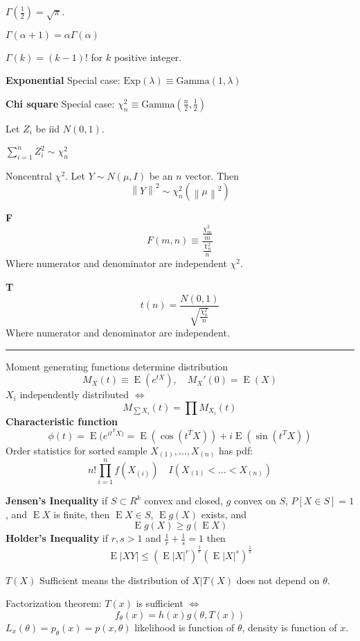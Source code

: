 \documentclass[10pt, twocolumn]{article}
\newcommand{\norm}[1]{\left\lVert#1\right\rVert}
\newcommand{\Expect}{\operatorname{E}}
\begin{document}
$\Gamma(\frac{1}{2}) = \sqrt{\pi}$.

$\Gamma(\alpha + 1) = \alpha \Gamma(\alpha)$

$\Gamma(k) = (k-1)!$ for $k$ positive integer.

\textbf{Exponential}
Special case: $\text{Exp}(\lambda) \equiv \text{Gamma}(1, \lambda)$

\textbf{Chi square}
Special case: $\chi^2_n \equiv \text{Gamma}(\frac{n}{2}, \frac{1}{2})$

Let $Z_i$ be iid $N(0, 1)$.

$\sum_{i=1}^n Z_i^2 \sim \chi^2_n$

Noncentral $\chi^2$. Let $Y \sim N(\mu, I)$ be an $n$ vector. Then 
\[
    \norm{Y}^2 \sim \chi^2_n(\norm{\mu}^2)
\]

\textbf{F}
\[
    F(m, n) \equiv \frac{\frac{\chi^2_m}{m}}
        {\frac{\chi^2_n}{n}}
\]
Where numerator and denominator are independent $\chi^2$.

\textbf{T}
\[
    t(n) = \frac{N(0, 1)}
    {\sqrt{\frac{\chi^2_n}{n}}}
\]
Where numerator and denominator are independent.

\vspace{0.2in}
\hrule

Moment generating functions determine distribution
\[
    M_X(t) \equiv \Expect (e^{tX}),
    \quad M_X'(0) = \Expect(X)
\]
$X_i$ independently distributed $\iff$
\[
    M_{\sum X_i} (t) = \prod M_{X_i} (t)
\]
\textbf{Characteristic function}
\[
    \phi(t) = \Expect (e^{i t^T X)}
    = \Expect (\cos (t^T X)) + i \Expect(\sin(t^T X))
\]
Order statistics for sorted sample $X_{(1)}, \dots, X_{(n)}$ has pdf:
\[
    n! \prod_{i=1}^n f(X_{(i)}) \quad I(X_{(1)} < \dots < X_{(n)})
\]

\newpage

\textbf{Jensen's Inequality} if $S \subset R^k$ convex and closed, $g$ convex on $S$, $P[X
\in S] = 1$, and $\Expect X$ is finite, then $\Expect X \in S$, $\Expect
g(X)$ exists, and
\[
    \Expect g(X) \geq g(\Expect X)
\]
\textbf{Holder's Inequality} if $r, s > 1$ and $\frac{1}{r} + \frac{1}{s} =
1$ then
\[
    \Expect |XY| \leq (\Expect |X|^r)^{\frac{1}{r}}(\Expect |X|^s)^{\frac{1}{s}}
\]

$T(X)$ Sufficient means the distribution of $X | T(X)$ does not depend on
$\theta$.

Factorization theorem: $T(x)$ is sufficient $\iff$
\[
    f_{\theta}(x) = h(x) g(\theta, T(x))
\]
$L_x (\theta) = p_\theta (x) = p(x, \theta)$ likelihood is function of
$\theta$, density is function of $x$.
\end{document}
